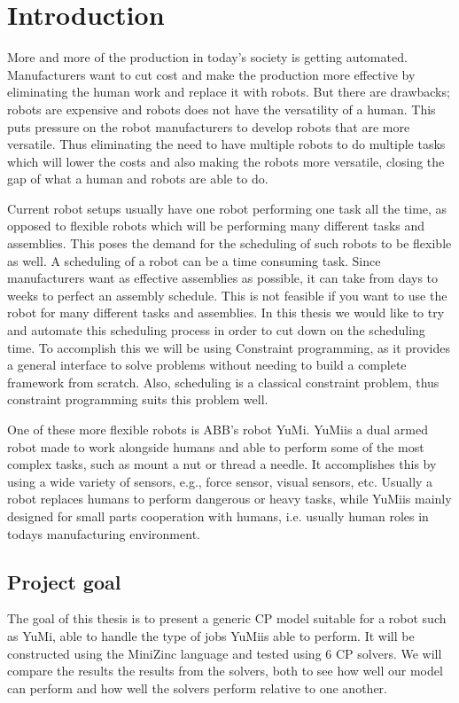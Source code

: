 \chapter{Introduction} 

More and more of the production in today's society is getting automated. Manufacturers want to cut cost and make the production more effective by eliminating the human work and replace it with robots. But there are drawbacks; robots are expensive and robots does not have the versatility of a human. This puts pressure on the robot manufacturers to develop robots that are more versatile. Thus eliminating the need to have multiple robots to do multiple tasks which will lower the costs and also making the robots more versatile, closing the gap of what a human and robots are able to do.

Current robot setups usually have one robot performing one task all the time, as opposed to flexible robots which will be performing many different tasks and assemblies. This poses the demand for the scheduling of such robots to be flexible as well. A scheduling of a robot can be a time consuming task. Since manufacturers want as effective assemblies as possible, it can take from days to weeks to perfect an assembly schedule. This is not feasible if you want to use the robot for many different tasks and assemblies. In this thesis we would like to try and automate this scheduling process in order to cut down on the scheduling time. To accomplish this we will be using Constraint programming, as it provides a general interface to solve problems without needing to build a complete framework from scratch. Also, scheduling is a classical constraint problem, thus constraint programming suits this problem well.

One of these more flexible robots is ABB's robot YuMi\textsuperscript\textregistered. YuMi\textsuperscript\textregistered is a dual armed robot made to work alongside humans and able to perform some of the most complex tasks, such as mount a nut or thread a needle\cite{_yumi_}. It accomplishes this by using a wide variety of sensors, e.g., force sensor, visual sensors, etc. Usually a robot replaces humans to perform dangerous or heavy tasks, while YuMi\textsuperscript\textregistered is mainly designed for small parts cooperation with humans, i.e. usually human roles in todays manufacturing environment.



\section{Project goal}
The goal of this thesis is to present a generic CP model suitable for a robot such as YuMi\textsuperscript\textregistered, able to handle the type of jobs YuMi\textsuperscript\textregistered is able to perform. It will be constructed using the MiniZinc language and tested using 6 CP solvers. We will compare the results the results from the solvers, both to see how well our model can perform and how well the solvers perform relative to one another.

